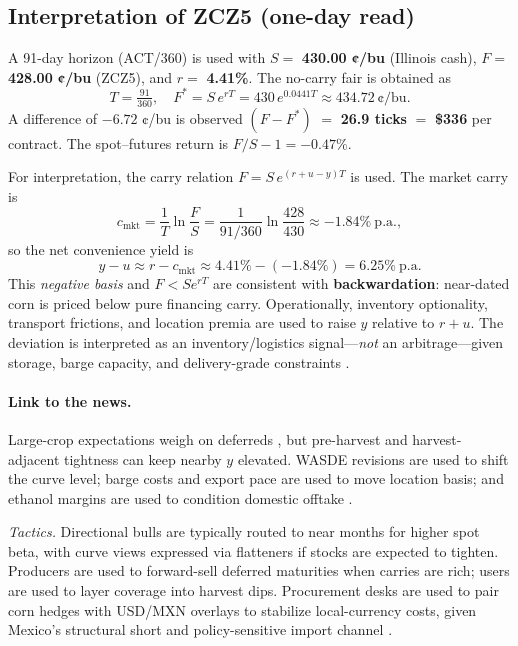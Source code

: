 \documentclass[11pt,a4paper]{article} %
\begin{document}
\subsection{Interpretation of \texorpdfstring{ZCZ5}{ZCZ5} (one-day read)}
A 91-day horizon (ACT/360) is used with \(S=\) \textbf{430.00 ¢/bu} (Illinois cash), \(F=\) \textbf{428.00 ¢/bu} (ZCZ5), and \(r=\) \textbf{4.41\%}. The no-carry fair is obtained as
\[
T=\tfrac{91}{360},\quad F^{*}=S\,e^{rT}=430\,e^{0.0441T}\approx \mathbf{434.72}\ \text{¢/bu}.
\]
A difference of \(\mathbf{-6.72}\) ¢/bu is observed \((F-F^{*})\) \(=\) \textbf{26.9 ticks} \(=\) \textbf{\$336} per contract. The spot–futures return is \(F/S-1=\mathbf{-0.47\%}\).

For interpretation, the carry relation \(F=S\,e^{(r+u-y)T}\) is used. The market carry is
\[
c_{\text{mkt}}=\frac{1}{T}\ln\!\frac{F}{S}
=\frac{1}{91/360}\ln\!\frac{428}{430}\approx \mathbf{-1.84\%}\ \text{p.a.},
\]
so the net convenience yield is
\[
y-u \approx r-c_{\text{mkt}}\approx 4.41\%-(-1.84\%)=\mathbf{6.25\%}\ \text{p.a.}
\]
This \emph{negative basis} and \(F<S e^{rT}\) are consistent with \textbf{backwardation}: near-dated corn is priced below pure financing carry. Operationally, inventory optionality, transport frictions, and location premia are used to raise \(y\) relative to \(r+u\). The deviation is interpreted as an inventory/logistics signal—\emph{not} an arbitrage—given storage, barge capacity, and delivery-grade constraints \citep{ams_gtr_2023,ncga_storage_2025}.

\paragraph{Link to the news.}
Large-crop expectations weigh on deferreds \citep{reuters_record_crop_2025}, but pre-harvest and harvest-adjacent tightness can keep nearby \(y\) elevated. WASDE revisions are used to shift the curve level; barge costs and export pace are used to move location basis; and ethanol margins are used to condition domestic offtake \citep{usda_wasde,ams_gtr_2023,ers_ethanol_40}.

\medskip
\noindent\emph{Tactics.} Directional bulls are typically routed to near months for higher spot beta, with curve views expressed via flatteners if stocks are expected to tighten. Producers are used to forward-sell deferred maturities when carries are rich; users are used to layer coverage into harvest dips. Procurement desks are used to pair corn hedges with USD/MXN overlays to stabilize local-currency costs, given Mexico’s structural short and policy-sensitive import channel \citep{fas_mexico_grain_annual_2025}.
\end{document}
